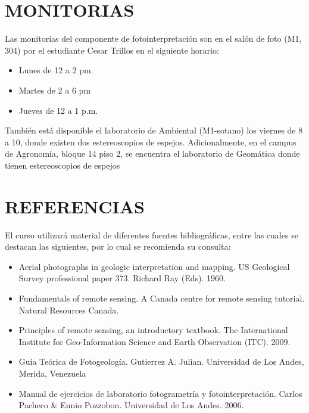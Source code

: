 \documentclass[a4paper,twoside,11pt,]{article}
\begin{document}
\section{MONITORIAS}
Las monitorias del componente de fotointerpretación son en el salón de foto (M1, 304) por el estudiante Cesar Trillos en el siguiente horario:
\begin{itemize}
\item Lunes de 12 a 2 pm.
\item Martes de 2 a 6 pm
\item Jueves de 12 a 1 p.m.
\end{itemize}

También está disponible el laboratorio de Ambiental (M1-sotano) los viernes de 8 a 10, donde existen dos estereoscopios de espejos. Adicionalmente, en el campus de Agronomía, bloque 14 piso 2, se encuentra el laboratorio de Geomática donde tienen estereoscopios de espejos

\section{REFERENCIAS}
El curso utilizará material de diferentes fuentes bibliográficas, entre las cuales se destacan las siguientes, por lo cual se recomienda su consulta:
\begin{itemize}
\item Aerial photographs in geologic interpretation and mapping. US Geological Survey professional paper 373. Richard Ray (Eds). 1960.
\item Fundamentals of remote sensing. A Canada centre for remote sensing tutorial. Natural Resources Canada. 
\item Principles of remote sensing, an introductory textbook. The International Institute for Geo-Information Science and Earth Observation (ITC). 2009.
\item Guía Teórica de Fotogeología. Gutierrez A. Julian. Universidad de Los Andes, Merida, Venezuela
\item Manual de ejercicios de laboratorio fotogrametría y fotointerpretación. Carlos Pacheco \& Ennio Pozzobon. Universidad de Los Andes. 2006.
\end{itemize}
\end{document}
